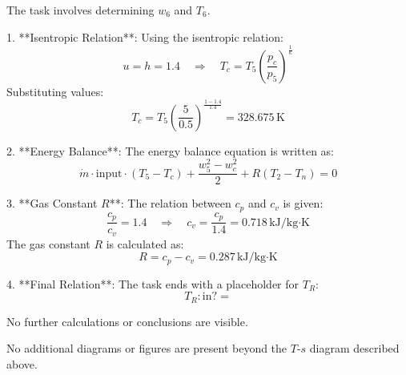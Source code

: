 The task involves determining \( w_6 \) and \( T_6 \).  

1. **Isentropic Relation**:  
   Using the isentropic relation:  
   \[
   u = h = 1.4 \quad \Rightarrow \quad T_c = T_5 \left( \frac{p_c}{p_5} \right)^{\frac{1}{\kappa}}
   \]  
   Substituting values:  
   \[
   T_c = T_5 \left( \frac{5}{0.5} \right)^{\frac{1-1.4}{1.4}} = 328.675 \, \text{K}
   \]  

2. **Energy Balance**:  
   The energy balance equation is written as:  
   \[
   \dot{m} \cdot \text{input} \cdot (T_5 - T_c) + \frac{w_5^2 - w_c^2}{2} + R(T_2 - T_n) = 0
   \]  

3. **Gas Constant \( R \)**:  
   The relation between \( c_p \) and \( c_v \) is given:  
   \[
   \frac{c_p}{c_v} = 1.4 \quad \Rightarrow \quad c_v = \frac{c_p}{1.4} = 0.718 \, \text{kJ/kg·K}
   \]  
   The gas constant \( R \) is calculated as:  
   \[
   R = c_p - c_v = 0.287 \, \text{kJ/kg·K}
   \]  

4. **Final Relation**:  
   The task ends with a placeholder for \( T_R \):  
   \[
   T_R: \text{in?} = 
   \]  

No further calculations or conclusions are visible.  

No additional diagrams or figures are present beyond the \( T \)-\( s \) diagram described above.